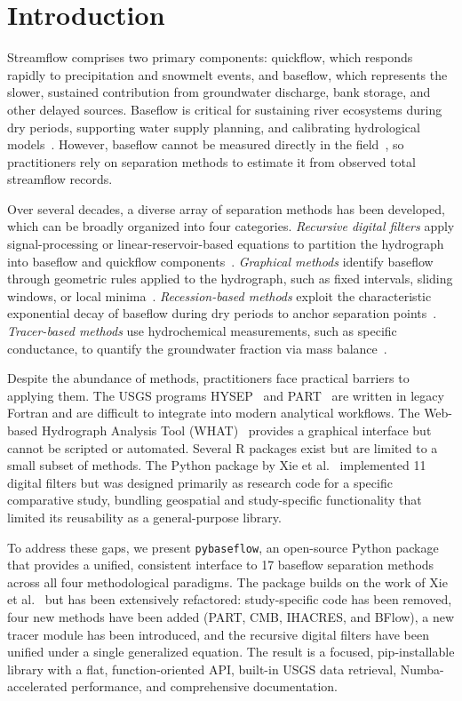 \documentclass[hydrology,article,submit,pdftex,moreauthors]{Definitions/mdpi}
\begin{document}
\section{Introduction}
\label{sec:introduction}

Streamflow comprises two primary components: quickflow, which responds rapidly to precipitation and snowmelt events, and baseflow, which represents the slower, sustained contribution from groundwater discharge, bank storage, and other delayed sources. Baseflow is critical for sustaining river ecosystems during dry periods, supporting water supply planning, and calibrating hydrological models~\cite{ChapmanMaxwell1996,Eckhardt2005}. However, baseflow cannot be measured directly in the field~\cite{ChapmanMaxwell1996}, so practitioners rely on separation methods to estimate it from observed total streamflow records.

Over several decades, a diverse array of separation methods has been developed, which can be broadly organized into four categories. \textit{Recursive digital filters} apply signal-processing or linear-reservoir-based equations to partition the hydrograph into baseflow and quickflow components~\cite{Lyne1979,Chapman1991,Eckhardt2005}. \textit{Graphical methods} identify baseflow through geometric rules applied to the hydrograph, such as fixed intervals, sliding windows, or local minima~\cite{Sloto1996}. \textit{Recession-based methods} exploit the characteristic exponential decay of baseflow during dry periods to anchor separation points~\cite{Rutledge1998}. \textit{Tracer-based methods} use hydrochemical measurements, such as specific conductance, to quantify the groundwater fraction via mass balance~\cite{Stewart2007}.

Despite the abundance of methods, practitioners face practical barriers to applying them. The USGS programs HYSEP~\cite{Sloto1996} and PART~\cite{Rutledge1998} are written in legacy Fortran and are difficult to integrate into modern analytical workflows. The Web-based Hydrograph Analysis Tool (WHAT)~\cite{Lim2005} provides a graphical interface but cannot be scripted or automated. Several R packages exist but are limited to a small subset of methods. The Python package by Xie et al.~\cite{Xie2020} implemented 11 digital filters but was designed primarily as research code for a specific comparative study, bundling geospatial and study-specific functionality that limited its reusability as a general-purpose library.

To address these gaps, we present \texttt{pybaseflow}, an open-source Python package that provides a unified, consistent interface to 17 baseflow separation methods across all four methodological paradigms. The package builds on the work of Xie et al.~\cite{Xie2020} but has been extensively refactored: study-specific code has been removed, four new methods have been added (PART, CMB, IHACRES, and BFlow), a new tracer module has been introduced, and the recursive digital filters have been unified under a single generalized equation. The result is a focused, pip-installable library with a flat, function-oriented API, built-in USGS data retrieval, Numba-accelerated performance, and comprehensive documentation.
\end{document}

